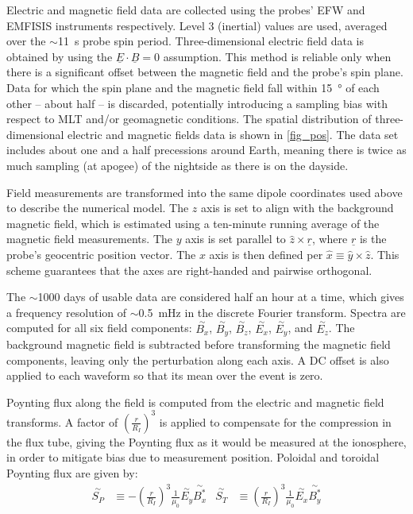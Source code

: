 \documentclass{article}
\newcommand{\about}{\ensuremath{\sim}}
\newcommand{\dft}[1]{\ensuremath{\overset{\sim}{#1}}\xspace}
\newcommand{\x}{\ensuremath{x}\xspace}
\newcommand{\y}{\ensuremath{y}\xspace}
\newcommand{\z}{\ensuremath{z}\xspace}
\newcommand{\xhat}{\ensuremath{\hat{x}}\xspace}
\newcommand{\yhat}{\ensuremath{\hat{y}}\xspace}
\newcommand{\zhat}{\ensuremath{\hat{z}}\xspace}
\renewcommand{\vec}[1]{\ensuremath{\underline{#1}}}
\newcommand{\lr}[1]{ \left( #1 \right) }
\newcommand{\mz}{\ensuremath{\mu_0}\xspace}
\begin{document}
Electric and magnetic field data are collected using the probes' EFW\cite{wygant_2013} and EMFISIS\cite{kletzing_2013} instruments respectively. Level 3 (inertial) values are used, averaged over the \about\SI{11}{\second} probe spin period. Three-dimensional electric field data is obtained by using the $\vec{E} \cdot \vec{B} = 0$ assumption. This method is reliable only when there is a significant offset between the magnetic field and the probe's spin plane. Data for which the spin plane and the magnetic field fall within \SI{15}{\degree} of each other -- about half -- is discarded, potentially introducing a sampling bias with respect to MLT and/or geomagnetic conditions. The spatial distribution of three-dimensional electric and magnetic fields data is shown in \cref{fig_pos}. The data set includes about one and a half precessions around Earth, meaning there is twice as much sampling (at apogee) of the nightside as there is on the dayside.

Field measurements are transformed into the same dipole coordinates used above to describe the numerical model. The \z axis is set to align with the background magnetic field, which is estimated using a ten-minute running average of the magnetic field measurements. The \y axis is set parallel to $\zhat \times \vec{r}$, where \vec{r} is the probe's geocentric position vector. The \x axis is then defined per $\xhat \equiv \yhat \times \zhat$. This scheme guarantees that the axes are right-handed and pairwise orthogonal\cite{liu_2009}.

The \about1000 days of usable data are considered half an hour at a time, which gives a frequency resolution of \about\SI{0.5}{\mHz} in the discrete Fourier transform. Spectra are computed for all six field components: \dft{B_x}, \dft{B_y}, \dft{B_z}, \dft{E_x}, \dft{E_y}, and \dft{E_z}. The background
magnetic field is subtracted before transforming the magnetic field components, leaving only the perturbation along each axis. A DC offset is also applied to each waveform so that its mean over the event is zero.

Poynting flux along the field is computed from the electric and magnetic field transforms. A factor of $\lr{\frac{r}{R_I}}^3$ is applied to compensate for the compression in the flux tube, giving the Poynting flux as it would be measured at the ionosphere, in order to mitigate bias due to measurement position. Poloidal and toroidal Poynting flux are given by:
\begin{align}
  \dft{S_P} &\equiv -\lr{\frac{r}{R_I}}^3\frac{1}{\mz} \dft{E_y} \dft{B_x^*} &
  \dft{S_T} &\equiv  \lr{\frac{r}{R_I}}^3\frac{1}{\mz} \dft{E_x} \dft{B_y^*}
\end{align}
\end{document}
